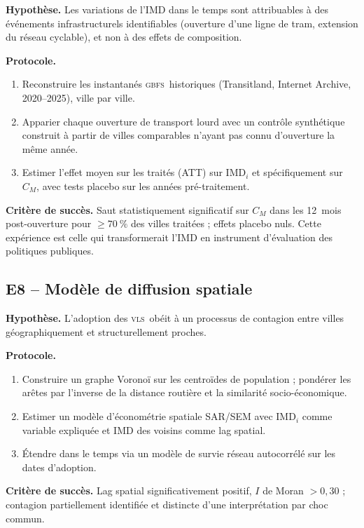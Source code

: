 \documentclass[11pt,a4paper]{article}
\newcommand{\IMD}{\mathrm{IMD}}
\newcommand{\VLS}{\textsc{vls}\xspace}
\newcommand{\GBFS}{\textsc{gbfs}\xspace}
\begin{document}
\begin{experience}[title=E7 -- Contrôle synthétique sur les
ouvertures d'infrastructure]
\textbf{Hypothèse.} Les variations de l'IMD dans le temps sont
attribuables à des événements infrastructurels identifiables
(ouverture d'une ligne de tram, extension du réseau cyclable),
et non à des effets de composition.

\textbf{Protocole.}
\begin{enumerate}[leftmargin=*,itemsep=0.2em]
    \item Reconstruire les instantanés \GBFS\ historiques
    (Transitland, Internet Archive, 2020--2025), ville par ville.
    \item Apparier chaque ouverture de transport lourd avec un
    contrôle synthétique \citep{Abadie2010, Abadie2021} construit
    à partir de villes comparables n'ayant pas connu d'ouverture
    la même année.
    \item Estimer l'effet moyen sur les traités (ATT) sur
    $\IMD_i$ et spécifiquement sur $C_M$, avec tests placebo sur
    les années pré-traitement.
\end{enumerate}

\textbf{Critère de succès.} Saut statistiquement significatif sur
$C_M$ dans les 12~mois post-ouverture pour
$\geq\SI{70}{\percent}$ des villes traitées ; effets placebo
nuls. Cette expérience est celle qui transformerait l'IMD en
instrument d'évaluation des politiques publiques.
\end{experience}

\subsection{E8 -- Modèle de diffusion spatiale}

\begin{experience}[title=E8 -- Graphe Voronoï et contagion
d'adoption]
\textbf{Hypothèse.} L'adoption des \VLS\ obéit à un processus de
contagion entre villes géographiquement et structurellement
proches.

\textbf{Protocole.}
\begin{enumerate}[leftmargin=*,itemsep=0.2em]
    \item Construire un graphe Voronoï sur les centroïdes de
    population ; pondérer les arêtes par l'inverse de la
    distance routière et la similarité socio-économique.
    \item Estimer un modèle d'économétrie spatiale SAR/SEM
    \citep{Anselin1995, LeSage2009} avec $\IMD_i$ comme variable
    expliquée et $\IMD$ des voisins comme lag spatial.
    \item Étendre dans le temps via un modèle de survie réseau
    autocorrélé sur les dates d'adoption.
\end{enumerate}

\textbf{Critère de succès.} Lag spatial significativement
positif, $I$ de Moran $> 0{,}30$ ; contagion partiellement
identifiée et distincte d'une interprétation par choc commun.
\end{experience}
\end{document}
